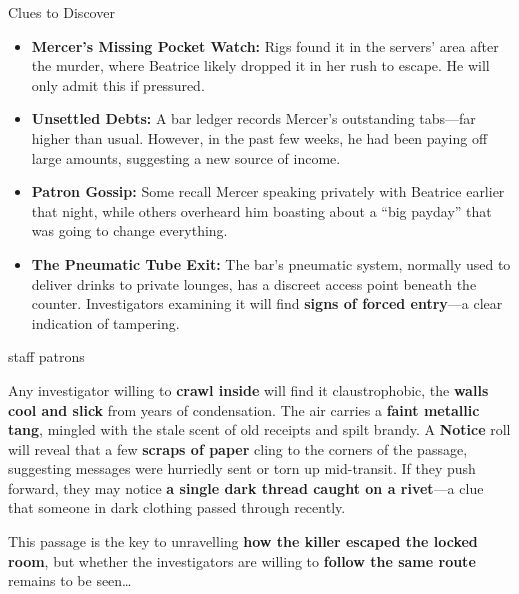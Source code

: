 \begin{CommentBox}{Clues to Discover}  
	\begin{itemize}  
		\item \textbf{Mercer’s Missing Pocket Watch:} Rigs found it in the servers’ area after the murder, where Beatrice likely dropped it in her rush to escape. He will only admit this if pressured.  
		\item \textbf{Unsettled Debts:} A bar ledger records Mercer’s outstanding tabs—far higher than usual. However, in the past few weeks, he had been paying off large amounts, suggesting a new source of income.  
		\item \textbf{Patron Gossip:} Some recall Mercer speaking privately with Beatrice earlier that night, while others overheard him boasting about a “big payday” that was going to change everything.  
		\item \textbf{The Pneumatic Tube Exit:} The bar’s pneumatic system, normally used to deliver drinks to private lounges, has a discreet access point beneath the counter. Investigators examining it will find \textbf{signs of forced entry}—a clear indication of tampering.  
	\end{itemize}  
\end{CommentBox}  

\BeginBoxPage
\begin{multicols}{2}
{staff}
\newcolumn
{patrons}
\end{multicols}
\EndBoxPage


Any investigator willing to \textbf{crawl inside} will find it claustrophobic, the \textbf{walls cool and slick} from years of condensation. The air carries a \textbf{faint metallic tang}, mingled with the stale scent of old receipts and spilt brandy. A  \textbf{Notice} roll will reveal that a few \textbf{scraps of paper} cling to the corners of the passage, suggesting messages were hurriedly sent or torn up mid-transit. If they push forward, they may notice \textbf{a single dark thread caught on a rivet}—a clue that someone in dark clothing passed through recently.  

This passage is the key to unravelling \textbf{how the killer escaped the locked room}, but whether the investigators are willing to \textbf{follow the same route} remains to be seen…  

